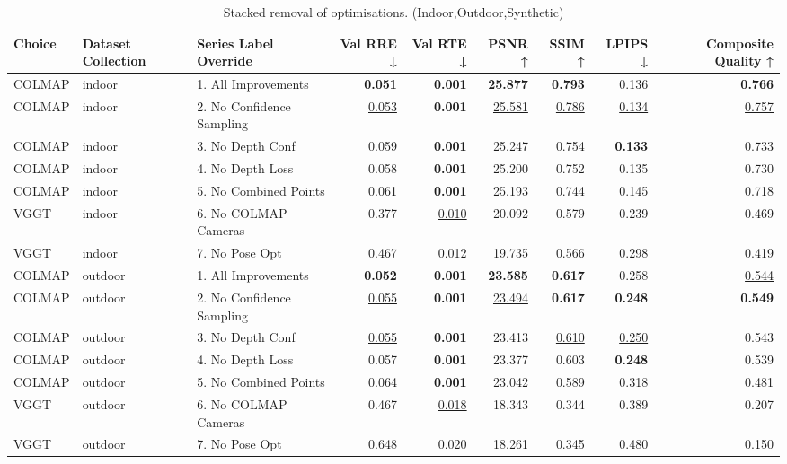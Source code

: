 \begin{table}[H]
\caption{\ifdefined\customcaption \customcaption \else Stacked removal of optimisations. (Indoor,Outdoor,Synthetic) \fi}
\label{tab:99_all_improvements_stacked_indoor,outdoor,synthetic}
\centering
\scriptsize
\begin{tabular}{lllrrrrrr}
\toprule
Choice & Dataset Collection & Series Label Override & Val RRE ↓ & Val RTE ↓ & PSNR ↑ & SSIM ↑ & LPIPS ↓ & Composite Quality ↑ \\
\midrule
COLMAP & indoor & 1. All Improvements & \textbf{0.051} & \textbf{0.001} & \textbf{25.877} & \textbf{0.793} & 0.136 & \textbf{0.766} \\
COLMAP & indoor & 2. No Confidence Sampling & \underline{0.053} & \textbf{0.001} & \underline{25.581} & \underline{0.786} & \underline{0.134} & \underline{0.757} \\
COLMAP & indoor & 3. No Depth Conf & 0.059 & \textbf{0.001} & 25.247 & 0.754 & \textbf{0.133} & 0.733 \\
COLMAP & indoor & 4. No Depth Loss & 0.058 & \textbf{0.001} & 25.200 & 0.752 & 0.135 & 0.730 \\
COLMAP & indoor & 5. No Combined Points & 0.061 & \textbf{0.001} & 25.193 & 0.744 & 0.145 & 0.718 \\
VGGT & indoor & 6. No COLMAP Cameras & 0.377 & \underline{0.010} & 20.092 & 0.579 & 0.239 & 0.469 \\
VGGT & indoor & 7. No Pose Opt & 0.467 & 0.012 & 19.735 & 0.566 & 0.298 & 0.419 \\
\midrule
COLMAP & outdoor & 1. All Improvements & \textbf{0.052} & \textbf{0.001} & \textbf{23.585} & \textbf{0.617} & 0.258 & \underline{0.544} \\
COLMAP & outdoor & 2. No Confidence Sampling & \underline{0.055} & \textbf{0.001} & \underline{23.494} & \textbf{0.617} & \textbf{0.248} & \textbf{0.549} \\
COLMAP & outdoor & 3. No Depth Conf & \underline{0.055} & \textbf{0.001} & 23.413 & \underline{0.610} & \underline{0.250} & 0.543 \\
COLMAP & outdoor & 4. No Depth Loss & 0.057 & \textbf{0.001} & 23.377 & 0.603 & \textbf{0.248} & 0.539 \\
COLMAP & outdoor & 5. No Combined Points & 0.064 & \textbf{0.001} & 23.042 & 0.589 & 0.318 & 0.481 \\
VGGT & outdoor & 6. No COLMAP Cameras & 0.467 & \underline{0.018} & 18.343 & 0.344 & 0.389 & 0.207 \\
VGGT & outdoor & 7. No Pose Opt & 0.648 & 0.020 & 18.261 & 0.345 & 0.480 & 0.150 \\

\end{tabular}
\end{table}
